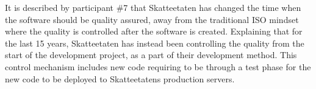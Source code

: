 It is described by participant \#7 that Skatteetaten has changed the time when the software should be quality assured, away from the traditional ISO mindset where the quality is controlled after the software is created. Explaining that for the last 15 years, Skatteetaten has instead been controlling the quality from the start of the development project, as a part of their development method. This control mechanism includes new code requiring to be through a test phase for the new code to be deployed to Skatteetatens production servers.






